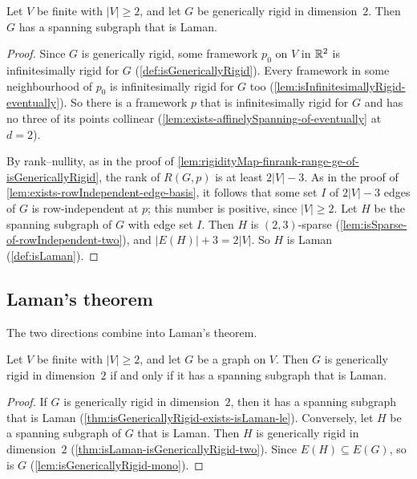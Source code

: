 \begin{theorem}
  \label{thm:isGenericallyRigid-exists-isLaman-le}
  \leanok
  Let $V$ be finite with $|V| \ge 2$, and let $G$ be generically rigid
  in dimension~$2$. Then $G$ has a spanning subgraph that is Laman.
\end{theorem}
\begin{proof}
  \leanok
  Since $G$ is generically rigid, some framework $p_0$ on $V$ in
  ${\mathbb{R}}^{2}$ is infinitesimally rigid for $G$
  (\cref{def:isGenericallyRigid}). Every framework in some neighbourhood
  of $p_0$ is infinitesimally rigid for $G$ too
  (\cref{lem:isInfinitesimallyRigid-eventually}). So there is a
  framework $p$ that is infinitesimally rigid for $G$ and has no three
  of its points collinear
  (\cref{lem:exists-affinelySpanning-of-eventually} at $d = 2$).

  By rank--nullity, as in the proof of
  \cref{lem:rigidityMap-finrank-range-ge-of-isGenericallyRigid}, the
  rank of $R(G, p)$ is at least $2|V| - 3$. As in the proof of
  \cref{lem:exists-rowIndependent-edge-basis}, it follows that some set
  $I$ of $2|V| - 3$ edges of $G$ is row-independent at $p$; this number
  is positive, since $|V| \ge 2$. Let $H$ be the spanning subgraph of
  $G$ with edge set $I$. Then $H$ is $(2, 3)$-sparse
  (\cref{lem:isSparse-of-rowIndependent-two}), and
  $|E(H)| + 3 = 2|V|$. So $H$ is Laman (\cref{def:isLaman}).
\end{proof}

\subsection{Laman's theorem}

The two directions combine into Laman's theorem.

\begin{theorem}
  \label{thm:isGenericallyRigid-two-iff-exists-isLaman-le}
  \leanok
  Let $V$ be finite with $|V| \ge 2$, and let $G$ be a graph on $V$.
  Then $G$ is generically rigid in dimension~$2$ if and only if it has
  a spanning subgraph that is Laman.
\end{theorem}
\begin{proof}
  \leanok
  If $G$ is generically rigid in dimension~$2$, then it has a spanning
  subgraph that is Laman
  (\cref{thm:isGenericallyRigid-exists-isLaman-le}). Conversely, let
  $H$ be a spanning subgraph of $G$ that is Laman. Then $H$ is
  generically rigid in dimension~$2$
  (\cref{thm:isLaman-isGenericallyRigid-two}). Since
  $E(H) \subseteq E(G)$, so is $G$ (\cref{lem:isGenericallyRigid-mono}).
\end{proof}
